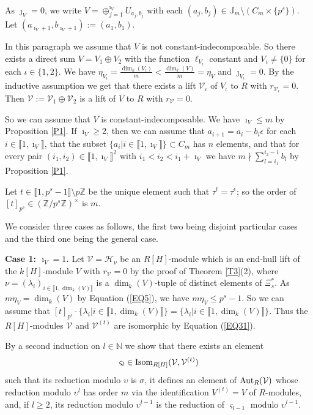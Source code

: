\documentclass[11pt]{amsart}
\def\Aut{\textup{Aut}}
\def\Isom{\textup{Isom}}
\begin{document}
As $\jmath_V=0$, we write $V=\oplus_{j=1}^{\imath_V} U_{a_j,b_j}$ with each $(a_j,b_j)\in\mathbb J_m\setminus (C_m\times\{p^s\})$. Let $(a_{\imath_V+1},b_{\imath_V+1}):=(a_1,b_1)$.

In this paragraph we assume that $V$ is not constant-indecomposable. So there exists a direct sum $V=V_1\oplus V_2$ with the function $\ell_{V_{\iota}}$ constant and $V_{\iota}\neq\{0\}$ for each $\iota\in\{1,2\}$. We have $\eta_{V_{\iota}}=\frac{\dim_k(V_{\iota})}{m}<\frac{\dim_k(V)}{m}=\eta_V$ and $\jmath_{V_{\iota}}=0$. By the inductive assumption we get that there exists a lift $\mathcal V_{\iota}$ of $V_{\iota}$ to $R$ with $r_{\mathcal V_{\iota}}=0$. Then $\mathcal V:=\mathcal V_1\oplus\mathcal V_2$ is a lift of $V$ to $R$ with $r_{\mathcal V}=0$. 

So we can assume that $V$ is constant-indecomposable. We have $\imath_V\le m$ by Proposition \ref{P1}. If $\imath_V\ge 2$, then we can assume that $a_{i+1}=a_i-b_i\epsilon$ for each $i\in\llbracket1,\imath_V\rrbracket$, that the subset $\{a_i|i\in\llbracket1,\imath_V\rrbracket\}\subset C_m$ has $n$ elements, and that for every pair $(i_1,i_2)\in\llbracket1,\imath_V\rrbracket^2$ with $i_1<i_2<i_1+\imath_V$ we have $m\nmid \sum_{l=i_1}^{i_2-1} b_l$ by Proposition \ref{P1}.

Let $t\in\llbracket1,p^s-1\rrbracket\setminus p\mathbb Z$ be the unique element such that $\tau^t=\tau^{\epsilon}$; so the order of $[t]_{p^s}\in (\mathbb Z/p^s\mathbb Z)^{\times}$ is $m$. 

We consider three cases as follows, the first two being disjoint particular cases and the third one being the general case.

{\bf Case 1: $\imath_V=1$.} Let $\mathcal V=\mathcal H_{\nu}$ be an $R[H]$-module which is an end-hull lift of the $k[H]$-module $V$ with $r_{\mathcal V}=0$ by the proof of Theorem \ref{T3}(2), where $\nu=(\lambda_i)_{i\in\llbracket1,\dim_k(V)\rrbracket}$ is a $\dim_k(V)$-tuple of distinct elements of $\Xi_s^{\ast}$.  As $m\eta_V=\dim_k(V)$ by Equation (\ref{EQ5}), we have $m\eta_V\le p^s-1$. So we can assume that $[t]_{p^s}\cdot\{\lambda_i|i\in\llbracket1,\dim_k(V)\rrbracket\}=\{\lambda_i|i\in\llbracket1,\dim_k(V)\rrbracket\}$. Thus the $R[H]$-modules $\mathcal V$ and $\mathcal V^{(t)}$ are isomorphic by Equation (\ref{EQ31}). 

By a second induction on $l\in\mathbb N$ we show that there exists an element
$$\varsigma_l\in\Isom_{R[H]}(\mathcal V,\mathcal V^{(t)})$$
such that its reduction modulo $\upsilon$ is $\sigma$, it defines an element of $\Aut_{R}(\mathcal V)$ whose reduction modulo $\upsilon^l$ has order $m$ via the identification $V^{(t)}=V$ of $R$-modules, and, if $l\ge 2$, its reduction modulo $\upsilon^{l-1}$ is the reduction of $\varsigma_{l-1}$ modulo $\upsilon^{l-1}$. 
\end{document}
